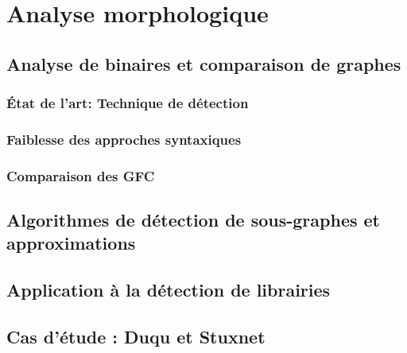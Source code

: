 \documentclass[12pt, oneside]{TUL/thesul}
\begin{document}
% 

\part{Analyse morphologique}
\DontFrameThisInToc
\chapter{Analyse de binaires et comparaison de graphes}
\section{État de l'art: Technique de détection}
\section{Faiblesse des approches syntaxiques}
\section{Comparaison des GFC}

\DontFrameThisInToc
\chapter{Algorithmes de détection de sous-graphes et approximations}



\DontFrameThisInToc
\chapter{Application à la détection de librairies}

\DontFrameThisInToc
\chapter{Cas d'étude : Duqu et Stuxnet}

\PutLineInToc
\end{document}
